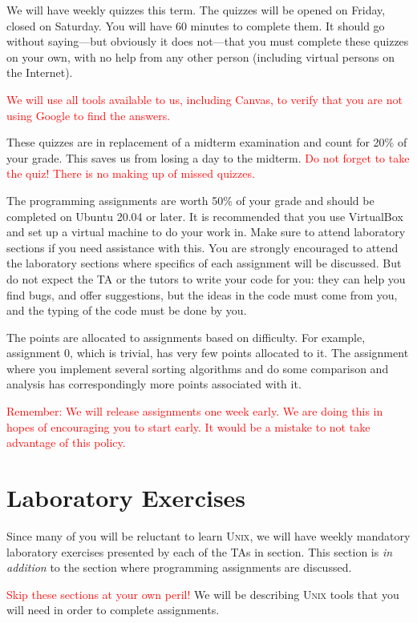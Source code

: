 \documentclass[12pt]{article}
\begin{document}
We will have weekly quizzes this term. The quizzes will be opened on
Friday, closed on Saturday. You will have 60 minutes to complete them.
It should go without saying---but obviously it does not---that you must
complete these quizzes on your own, with no help from any other person
(including virtual persons on the Internet).

\textcolor{red}{We will use all tools available to us, including Canvas,
to verify that you are not using Google to find the answers.}

These quizzes are in replacement of a midterm examination and count for
20\% of your grade. This saves us from losing a day to the midterm.
\textcolor{red}{Do not forget to take the quiz! There is no making up of
missed quizzes.}

The programming assignments are worth 50\% of your grade and should be
completed on Ubuntu 20.04 or later. It is recommended that you use
VirtualBox and set up a virtual machine to do your work in. Make sure to
attend laboratory sections if you need assistance with this. You are
strongly encouraged to attend the laboratory sections where specifics of
each assignment will be discussed. But do not expect the TA or the
tutors to write your code for you: they can help you find bugs, and
offer suggestions, but the ideas in the code must come from you, and the
typing of the code must be done by you.

The points are allocated to assignments based on difficulty. For
example, assignment 0, which is trivial, has very few points allocated
to it. The assignment where you implement several sorting algorithms and
do some comparison and analysis has correspondingly more points
associated with it.

\textcolor{red}{Remember: We will release assignments one week early. We
are doing this in hopes of encouraging you to start early. It would be a
mistake to not take advantage of this policy.}

\section{Laboratory Exercises}

Since many of you will be reluctant to learn \textsc{Unix}, we will have
weekly mandatory laboratory exercises presented by each of the TAs in
section. This section is \emph{in addition} to the section where
programming assignments are discussed.

\textcolor{red}{Skip these sections at your own peril!} We will be
describing \textsc{Unix} tools that you will need in order to complete
assignments.
\end{document}
